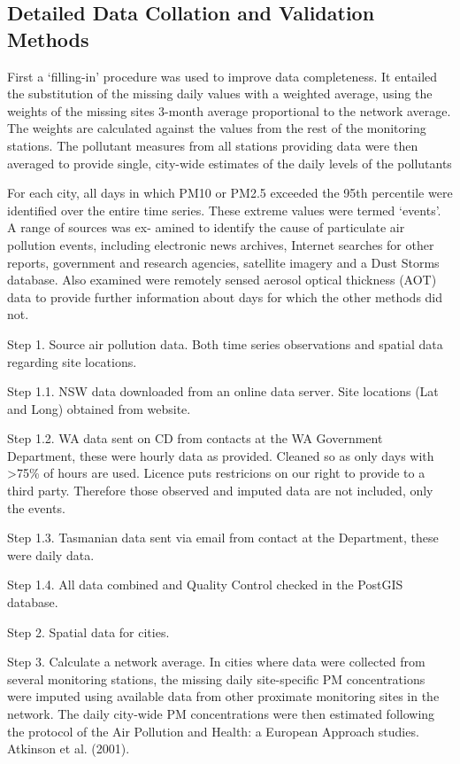 \subsection{Detailed Data Collation and Validation
Methods}\label{detailed-data-collation-and-validation-methods}

First a `filling-in' procedure was used to improve data completeness. It
entailed the substitution of the missing daily values with a weighted
average, using the weights of the missing sites 3-month average
proportional to the network average. The weights are calculated against
the values from the rest of the monitoring stations. The pollutant
measures from all stations providing data were then averaged to provide
single, city-wide estimates of the daily levels of the pollutants

For each city, all days in which PM10 or PM2.5 exceeded the 95th
percentile were identified over the entire time series. These extreme
values were termed `events'. A range of sources was ex- amined to
identify the cause of particulate air pollution events, including
electronic news archives, Internet searches for other reports,
government and research agencies, satellite imagery and a Dust Storms
database. Also examined were remotely sensed aerosol optical thickness
(AOT) data to provide further information about days for which the other
methods did not.

Step 1. Source air pollution data. Both time series observations and
spatial data regarding site locations.

Step 1.1. NSW data downloaded from an online data server. Site locations
(Lat and Long) obtained from website.

Step 1.2. WA data sent on CD from contacts at the WA Government
Department, these were hourly data as provided. Cleaned so as only days
with \textgreater{}75\% of hours are used. Licence puts restricions on
our right to provide to a third party. Therefore those observed and
imputed data are not included, only the events.

Step 1.3. Tasmanian data sent via email from contact at the Department,
these were daily data.

Step 1.4. All data combined and Quality Control checked in the PostGIS
database.

Step 2. Spatial data for cities.

Step 3. Calculate a network average. In cities where data were collected
from several monitoring stations, the missing daily site-specific PM
concentrations were imputed using available data from other proximate
monitoring sites in the network. The daily city-wide PM concentrations
were then estimated following the protocol of the Air Pollution and
Health: a European Approach studies. Atkinson et al. (2001).

